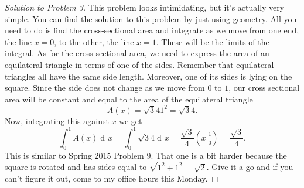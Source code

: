 \documentclass[12pt]{article}
\theoremstyle{plain}
\theoremstyle{definition}
\theoremstyle{remark}
\DeclareMathOperator{\diff}{d\!}
\begin{document}
\begin{proof}[Solution to Problem 3]
This problem looks intimidating, but it's actually very simple. You can
find the solution to this problem by just using geometry. All you need to
do is find the cross-sectional area and integrate as we move from one end,
the line $x=0$, to the other, the line $x=1$. These will be the limits of
the integral. As for the cross sectional area, we need to express the area
of an equilateral triangle in terms of one of the sides. Remember that
equilateral triangles all have the same side length. Moreover, one of its
sides is lying on the square. Since the side does not change as we move
from $0$ to $1$, our cross sectional area will be constant and equal to the
area of the equilateral triangle
\[
A(x)=\sqrt{3}{4}1^2=\sqrt{3}{4}.
\]
Now, integrating this against $x$ we get
\[
\int_0^1 A(x)\diff x=\int_0^1\sqrt{3}{4}\diff
x=\frac{\sqrt{3}}{4}\left(\left.x\right|_0^1\right)=\boxed{\frac{\sqrt{3}}{4}.}
\]
This is similar to Spring 2015 Problem 9. That one is a bit harder because
the square is rotated and has sides equal to
$\sqrt{1^2+1^2}=\sqrt{2}$. Give it a go and if you can't figure it out,
come to my office hours this Monday.
\end{proof}
\end{document}
